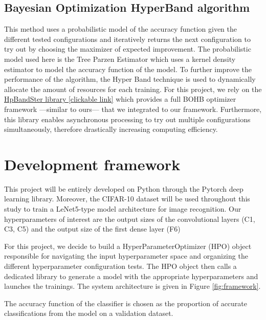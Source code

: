 \documentclass[a4 paper,11pt,2]{article}
\begin{document}
\subsection{Bayesian Optimization HyperBand algorithm \cite{falknerBOHBRobustEfficient2018}}
This method uses a probabilistic model of the accuracy function given the different tested configurations and iteratively returns the next configuration to try out by choosing the maximizer of expected improvement.  The probabilistic model used here is the Tree Parzen Estimator which uses a kernel density estimator to model the accuracy function of the model. To further improve the performance of the algorithm, the Hyper Band technique is used to dynamically allocate the amount of resources for each training. For this project, we rely on the \href{https://automl.github.io/HpBandSter/build/html/quickstart.html}{HpBandSter library [clickable link]} which provides a full BOHB optimizer framework ---similar to ours--- that we integrated to our framework. Furthermore, this library enables asynchronous processing to try out multiple configurations simultaneously, therefore drastically increasing computing efficiency.

\section{Development framework}
This project will be entirely developed on Python through the Pytorch deep
learning library. Moreover, the CIFAR-10 dataset will be used throughout this
study to train a LeNet5-type model architecture for image recognition. Our
hyperparameters of interest are the output sizes of the
convolutional layers (C1, C3, C5) and the output size of the first dense layer (F6)

For this project, we decide to build a HyperParameterOptimizer (HPO) object
responsible for navigating the input hyperparameter space and organizing the
different hyperparameter configuration tests. The HPO object then calls a
dedicated library to generate a model with the appropriate hyperparameters and
launches the trainings. The system architecture is given in Figure
\ref{fig:framework}.

The accuracy function of the classifier is chosen as the proportion of accurate classifications from the model on a validation dataset.
\end{document}
